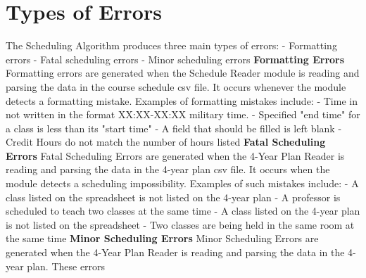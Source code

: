 \documentclass[12pt]{article}
\begin{document}
\section{Types of Errors}
The Scheduling Algorithm produces three main types of errors: \newline
 - Formatting errors \newline
 - Fatal scheduling errors \newline
 - Minor scheduling errors \newline
 \newline
 \textbf{Formatting Errors} \newline
Formatting errors are generated when the Schedule Reader module is reading and parsing the data in the course schedule csv file. It occurs whenever the module detects a formatting mistake. Examples of formatting mistakes include: \newline
 - Time in not written in the format XX:XX-XX:XX military time. \newline
 - Specified "end time" for a class is less than its "start time" \newline
 - A field that should be filled is left blank \newline
 - Credit Hours do not match the number of hours listed \newline
\newline
\textbf{Fatal Scheduling Errors} \newline
Fatal Scheduling Errors are generated when the 4-Year Plan Reader is reading and parsing the data in the 4-year plan csv file. It occurs when the module detects a scheduling impossibility. Examples of such mistakes include: \newline
 - A class listed on the spreadsheet is not listed on the 4-year plan \newline
 - A professor is scheduled to teach two classes at the same time \newline
 - A class listed on the 4-year plan is not listed on the spreadsheet \newline
 - Two classes are being held in the same room at the same time \newline
\newline
\textbf{Minor Scheduling Errors} \newline
Minor Scheduling Errors are generated when the 4-Year Plan Reader is reading and parsing the data in the 4-year plan. These errors 
\end{document}
